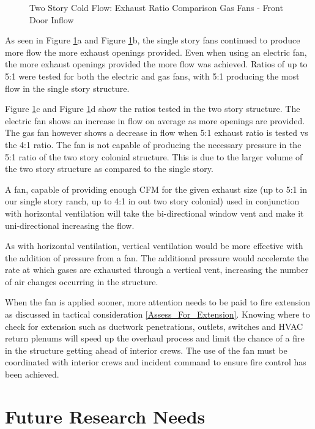 \documentclass{article}
\begin{document}
\begin{figure}[H]
\begin{tabular}{*2c}
	\end{tabular}
	\caption{Two Story Cold Flow: Exhaust Ratio Comparison Gas Fans - Front Door Inflow}
	\label{fig:MoreFlowTC}
\end{figure}

As seen in Figure \ref{fig:MoreFlowTC}a and Figure \ref{fig:MoreFlowTC}b, the single story fans continued to produce more flow the more exhaust openings provided. Even when using an electric fan, the more exhaust openings provided the more flow was achieved. Ratios of up to 5:1 were tested for both the electric and gas fans, with 5:1 producing the most flow in the single story structure. 

Figure \ref{fig:MoreFlowTC}c and Figure \ref{fig:MoreFlowTC}d show the ratios tested in the two story structure. The electric fan shows an increase in flow on average as more openings are provided. The gas fan however shows a decrease in flow when 5:1 exhaust ratio is tested vs the 4:1 ratio. The fan is not capable of producing the necessary pressure in the 5:1 ratio of the two story colonial structure. This is due to the larger volume of the two story structure as compared to the single story.

A fan, capable of providing enough CFM for the given exhaust size (up to 5:1 in our single story ranch, up to 4:1 in out two story colonial) used in conjunction with horizontal ventilation will take the bi-directional window vent and make it uni-directional increasing the flow.

As with horizontal ventilation, vertical ventilation would be more effective with the addition of pressure from a fan. The additional pressure would accelerate the rate at which gases are exhausted through a vertical vent, increasing the number of air changes occurring in the structure.

When the fan is applied sooner, more attention needs to be paid to fire extension as discussed in tactical consideration \ref{Assess_For_Extension}. Knowing where to check for extension such as ductwork penetrations, outlets, switches and HVAC return plenums will speed up the overhaul process and limit the chance of a fire in the structure getting ahead of interior crews.  The use of the fan must be coordinated with interior crews and incident command to ensure fire control has been achieved.  

\section{Future Research Needs}
\end{document}
